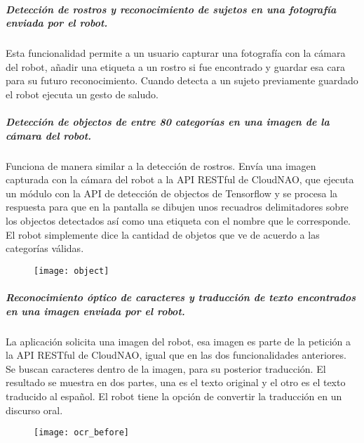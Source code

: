 \subparagraph{Detección de rostros y reconocimiento de sujetos en una fotografía enviada por el robot.}
\label{\detokenize{users_docs:deteccion-de-rostros-en-una-fotografia-enviada-por-el-robot}}
Esta funcionalidad permite a un usuario
capturar una fotografía con la cámara del robot, añadir
una etiqueta a un rostro si fue encontrado y guardar esa cara para su futuro reconocimiento.
Cuando detecta a un sujeto previamente guardado el robot ejecuta 
un gesto de saludo.

\begin{figure}[!h]
    \centering

\end{figure}


\subparagraph{Detección de objectos de entre 80 categorías en una imagen de la cámara del robot.}
\label{\detokenize{users_docs:deteccion-de-objectos-de-entre-80-categorias-en-una-imagen-de-la-camara-del-robot}}
Funciona de manera similar a la detección de rostros. Envía una imagen capturada
con la cámara del robot a la API RESTful de CloudNAO, que ejecuta un módulo
con la API de detección de objectos de Tensorflow y se procesa la respuesta para
que en la pantalla se dibujen unos
recuadros delimitadores sobre los objectos detectados así como una etiqueta
con el nombre que le corresponde. El robot simplemente
dice la cantidad de objetos que ve de acuerdo a las categorías válidas.

\begin{figure}[!h]
    \centering
	\texttt{[image: object]}%
\end{figure}


\subparagraph{Reconocimiento óptico de caracteres y traducción de texto encontrados en una imagen enviada por el robot.}
\label{\detokenize{users_docs:reconocimiento-optico-de-caracteres-y-traduccion-de-texto-encontrados-en-una-imagen-enviada-por-el-robot}}
La aplicación solicita una imagen del robot, esa imagen es parte de la petición
a la API RESTful de CloudNAO, igual que en las dos funcionalidades anteriores.
Se buscan caracteres dentro de la imagen, para su posterior traducción.
El resultado se muestra en dos partes, una es el texto original y el otro
es el texto traducido al español. El robot tiene la opción de convertir la
traducción en un discurso oral.

\begin{figure}[!h]
    \centering
    \texttt{[image: ocr\_before]}

\end{figure}


